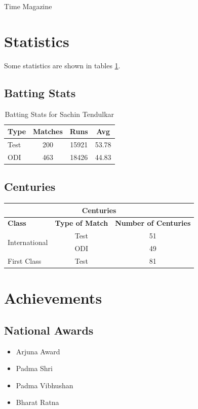 \documentclass{report}
\begin{document}
	\hfill Time Magazine
	
	\section{Statistics}
	Some statistics are shown in tables \ref{batstat}.
	\subsection{Batting Stats}
	\begin{table}[h]
		\begin{center}
			\begin{tabular}{|l|c|c|c|}
				\hline
				\textbf{Type}&\textbf{Matches}&\textbf{Runs}&\textbf{Avg}\\
				\hline
				Test&200&15921&53.78\\
				\hline
				ODI&463&18426&44.83\\
				\hline
			\end{tabular}
		\end{center}
		\caption{Batting Stats for Sachin Tendulkar}
		\label{batstat}
	\end{table}

	\subsection{Centuries}
	\begin{table}[h]
		\begin{center}
			\begin{tabular}{l|c|c}
				\hline
				\multicolumn{3}{c}{\textbf{Centuries}}\\
				\hline
				\textbf{Class} & \textbf{Type of Match} &\textbf{ Number of Centuries} \\
				\hline
				\hline
				\multirow{2}{*}{International} & Test & 51\\
				\cline{2-3}
				& ODI & 49\\
				\hline
				First Class & Test & 81\\
				\hline
			\end{tabular}
		\end{center}
	\end{table}
	\section{Achievements}
	\subsection{National Awards}
	\begin{itemize}
		\item Arjuna Award
		\item Padma Shri 
		\item Padma Vibhushan
		\item Bharat Ratna 
	\end{itemize}
\end{document}

